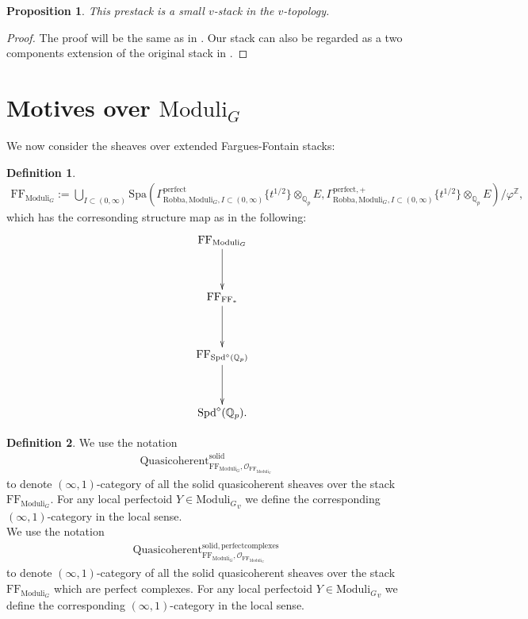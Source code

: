 \documentclass[12pt]{book}
\newtheorem{proposition}{Proposition}
\theoremstyle{definition}
\newtheorem{definition}{Definition}
\begin{document}
\begin{proposition}
This prestack is a small $v$-stack in the $v$-topology.
\end{proposition}

\begin{proof}
The proof will be the same as in \cite[Proposition III.1.3]{FS}. Our stack can also be regarded as a two components extension of the original stack in \cite{FS}.  
\end{proof}



\section{Motives over $\mathrm{Moduli}_G$}

\noindent We now consider the sheaves over extended Fargues-Fontain stacks:

\begin{definition}
\begin{align}
\mathrm{FF}_{\mathrm{Moduli}_G}:=\bigcup_{I\subset (0,\infty)}\mathrm{Spa}(\Gamma^\text{perfect}_{\text{Robba},{\mathrm{Moduli}_G},I\subset (0,\infty)}\{t^{1/2}\}\otimes_{\mathbb{Q}_p}E,\Gamma^{\text{perfect},+}_{\text{Robba},{\mathrm{Moduli}_G},I\subset (0,\infty)}\{t^{1/2}\}\otimes_{\mathbb{Q}_p}E)/\varphi^\mathbb{Z},
\end{align}
which has the corresonding structure map as in the following:
\[\displayindent=-0.4in
\xymatrix@R+1pc{
&\mathrm{FF}_{\mathrm{Moduli}_G} \ar[d]  \\
&\mathrm{FF}_{\mathrm{FF}_*} \ar[d]\\
&\mathrm{FF}_{\mathrm{Spd}^\diamond(\mathbb{Q}_p)} \ar[d]\\
& \mathrm{Spd}^\diamond(\mathbb{Q}_p).  
}
\]
\end{definition}

\begin{definition}
We use the notation
\begin{align}
\mathrm{Quasicoherent}^{\mathrm{solid}}_{\mathrm{FF}_{\mathrm{Moduli}_G},\mathcal{O}_{\mathrm{FF}_{\mathrm{Moduli}_G}}}
\end{align}
to denote $(\infty,1)$-category of all the solid quasicoherent sheaves over the stack $\mathrm{FF}_{\mathrm{Moduli}_G}$. For any local perfectoid $Y\in {\mathrm{Moduli}_G}_v$ we define the corresponding $(\infty,1)$-category in the local sense.\\
We use the notation
\begin{align}
\mathrm{Quasicoherent}^{\mathrm{solid,perfectcomplexes}}_{\mathrm{FF}_{\mathrm{Moduli}_G},\mathcal{O}_{\mathrm{FF}_{\mathrm{Moduli}_G}}}
\end{align}
to denote $(\infty,1)$-category of all the solid quasicoherent sheaves over the stack $\mathrm{FF}_{\mathrm{Moduli}_G}$ which are perfect complexes. For any local perfectoid $Y\in {\mathrm{Moduli}_G}_v$ we define the corresponding $(\infty,1)$-category in the local sense.
\end{definition}
\end{document}
